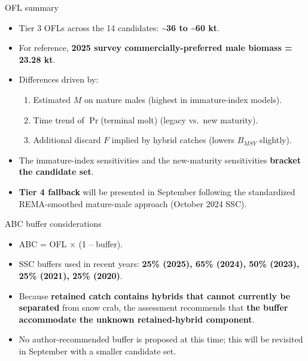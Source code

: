 \documentclass[
  10pt,
  ignorenonframetext,
  aspectratio=169,
]{beamer}
\providecommand{\tightlist}{%
  \setlength{\itemsep}{0pt}\setlength{\parskip}{0pt}}
\begin{document}
\begin{frame}{OFL summary}
\label{ofl-summary}
\small

\begin{itemize}
\tightlist
\item
  Tier 3 OFLs across the 14 candidates: \textbf{\textasciitilde36 to
  \textasciitilde60 kt}.
\item
  For reference, \textbf{2025 survey commercially-preferred male biomass
  = 23.28 kt}.
\item
  Differences driven by:

  \begin{enumerate}
  \tightlist
  \item
    Estimated \(M\) on mature males (highest in immature-index models).
  \item
    Time trend of \(\Pr\)(terminal molt) (legacy vs.~new maturity).
  \item
    Additional discard \(F\) implied by hybrid catches (lowers
    \(B_{MSY}\) slightly).
  \end{enumerate}
\item
  The immature-index sensitivities and the new-maturity sensitivities
  \textbf{bracket the candidate set}.
\item
  \textbf{Tier 4 fallback} will be presented in September following the
  standardized REMA-smoothed mature-male approach (October 2024 SSC).
\end{itemize}
\end{frame}

\begin{frame}{ABC buffer considerations}
\label{abc-buffer-considerations}
\small

\begin{itemize}
\tightlist
\item
  ABC = OFL \(\times\) (1 -- buffer).
\item
  SSC buffers used in recent years: \textbf{25\% (2025), 65\% (2024),
  50\% (2023), 25\% (2021), 25\% (2020)}.
\item
  Because \textbf{retained catch contains hybrids that cannot currently
  be separated} from snow crab, the assessment recommends that
  \textbf{the buffer accommodate the unknown retained-hybrid component}.
\item
  No author-recommended buffer is proposed at this time; this will be
  revisited in September with a smaller candidate set.
\end{itemize}
\end{frame}
\end{document}

